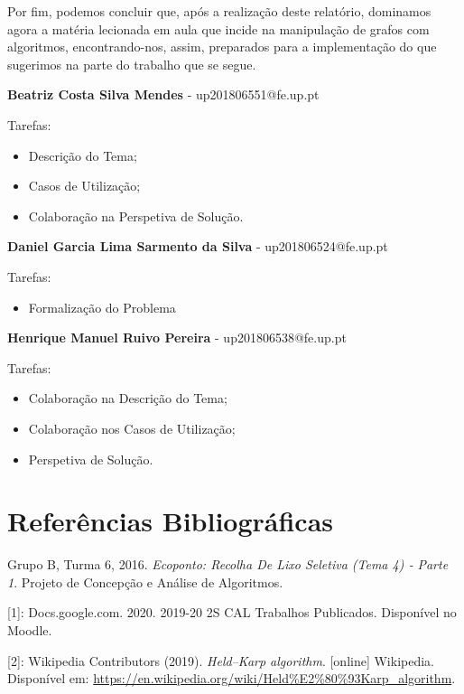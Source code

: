 \documentclass[article, a4paper, 12pt, oneside]{memoir}
\begin{document}
Por fim, podemos concluir que, após a realização deste relatório, dominamos agora a matéria lecionada em aula que incide na manipulação de grafos com algoritmos, encontrando-nos, assim, preparados para a implementação do que sugerimos na parte do trabalho que se segue.

\textbf{Beatriz Costa Silva Mendes} - up201806551@fe.up.pt

Tarefas:
\begin{itemize}
\item Descrição do Tema;
\item Casos de Utilização;
\item Colaboração na Perspetiva de Solução.
\end{itemize}

\textbf{Daniel Garcia Lima Sarmento da Silva} - up201806524@fe.up.pt

Tarefas:
\begin{itemize}
\item Formalização do Problema
\end{itemize}

\textbf{Henrique Manuel Ruivo Pereira} - up201806538@fe.up.pt

Tarefas:
\begin{itemize}
\item Colaboração na Descrição do Tema;
\item Colaboração nos Casos de Utilização;
\item Perspetiva de Solução.
\end{itemize}





\newpage
\chapter[Referências Bibliográficas][Referências Bibliográficas]{Referências Bibliográficas} \label{\thechapter}
Grupo B, Turma 6, 2016. \textit{Ecoponto: Recolha De Lixo Seletiva (Tema 4) ‐ Parte 1}. Projeto de Concepção e Análise de Algoritmos.

[1]: Docs.google.com. 2020. 2019-20 2S CAL Trabalhos Publicados. Disponível no Moodle.

[2]: Wikipedia Contributors (2019). \textit{Held–Karp algorithm}. [online] Wikipedia. Disponível em: \url{https://en.wikipedia.org/wiki/Held%E2%80%93Karp_algorithm}.
\end{document}

